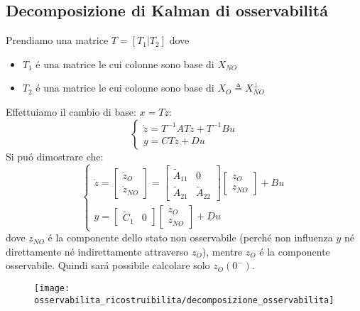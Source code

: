 \documentclass[../main.tex]{subfiles}
\begin{document}
	\subsection{Decomposizione di Kalman di osservabilit\'a}
		Prendiamo una matrice $ T = [T_1 | T_2] $ dove
		\begin{itemize}
			\item 
				$ T_1 $ \'e una matrice le cui colonne sono base di $ X_{NO} $
			\item
				$ T_2 $ \'e una matrice le cui colonne sono base di $ X_O \triangleq X_{NO}^{\perp} $
		\end{itemize}
		Effettuiamo il cambio di base: $ x = Tz $:
		\[
			\begin{cases}
				\dot z = T^{-1}ATz + T^{-1}Bu\\
				y = CTz + Du
			\end{cases}
		\]
		Si pu\'o dimostrare che:
		\[
			\begin{cases}
				\dot z =
				\begin{bmatrix}
					\dot z_O\\
					\dot z_{NO}
				\end{bmatrix} =
				\begin{bmatrix}
					\tilde A_{11} & 0\\
					\tilde A_{21} & \tilde A_{22}
				\end{bmatrix}
				\begin{bmatrix}
					z_O\\
					z_{NO}
				\end{bmatrix}
				+ Bu
				\\[.5cm]
				y =
				\begin{bmatrix}
					\tilde C_1 & 0
				\end{bmatrix}
				\begin{bmatrix}
					z_{O}\\
					z_{NO}
				\end{bmatrix}
				+ Du
			\end{cases}
		\]
		dove $ z_{NO} $ \'e la componente dello stato non osservabile (perch\'e non influenza $ y $ n\'e direttamente n\'e indirettamente attraverso $ z_O $), mentre $ z_O $ \'e la componente osservabile. Quindi sar\'a possibile calcolare solo $ z_O(0^{-}) $.
		
		\begin{figure}[H]
			\centering\texttt{[image: osservabilita\_ricostruibilita/decomposizione\_osservabilita]}
		\end{figure}
		
\end{document}
